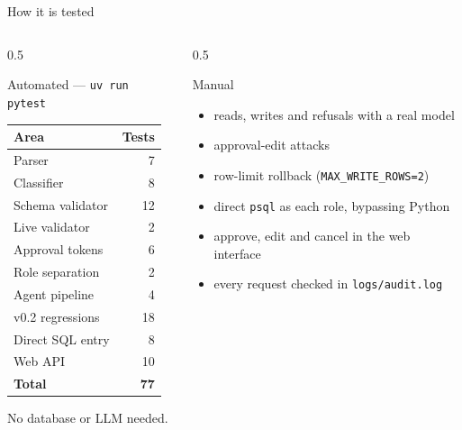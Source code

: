 \documentclass[aspectratio=169,10pt]{beamer}
\begin{document}
\begin{frame}{How it is tested}
  \begin{columns}[T]
    \begin{column}{0.5\textwidth}
      \begin{block}{Automated --- \texttt{uv run pytest}}
        \footnotesize
        \begin{tabular}{@{}lr@{}}
          \toprule
          \textbf{Area} & \textbf{Tests} \\
          \midrule
          Parser             & 7 \\
          Classifier         & 8 \\
          Schema validator   & 12 \\
          Live validator     & 2 \\
          Approval tokens    & 6 \\
          Role separation    & 2 \\
          Agent pipeline     & 4 \\
          v0.2 regressions   & 18 \\
          Direct SQL entry   & 8 \\
          Web API            & 10 \\
          \midrule
          \textbf{Total}     & \textbf{77} \\
          \bottomrule
        \end{tabular}

        \vspace{3pt}
        No database or LLM needed.
      \end{block}
    \end{column}
    \begin{column}{0.5\textwidth}
      \begin{block}{Manual}
        \footnotesize
        \begin{itemize}
          \item reads, writes and refusals with a real model
          \item approval-edit attacks
          \item row-limit rollback (\texttt{MAX\_WRITE\_ROWS=2})
          \item direct \texttt{psql} as each role, bypassing Python
          \item approve, edit and cancel in the web interface
          \item every request checked in \texttt{logs/audit.log}
        \end{itemize}
      \end{block}
    \end{column}
  \end{columns}
\end{frame}
\end{document}
